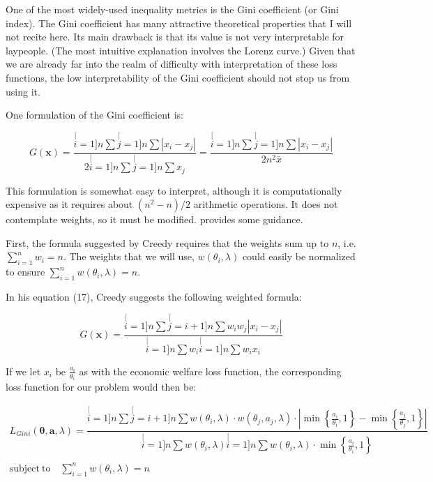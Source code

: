 \documentclass[english]{article}
\begin{document}
One of the most widely-used inequality metrics is the Gini coefficient
(or Gini index). The Gini coefficient has many attractive theoretical
properties that I will not recite here. Its main drawback is that
its value is not very interpretable for laypeople. (The most intuitive
explanation involves the Lorenz curve.) Given that we are already
far into the realm of difficulty with interpretation of these loss
functions, the low interpretability of the Gini coefficient should
not stop us from using it.

One formulation of the Gini coefficient is:

\[
G(\mathbf{x})=\dfrac{\stackrel[i=1]{n}{\sum}\stackrel[j=1]{n}{\sum}\left|x_{i}-x_{j}\right|}{2\stackrel[i=1]{n}{\sum}\stackrel[j=1]{n}{\sum}x_{j}}=\dfrac{\stackrel[i=1]{n}{\sum}\stackrel[j=1]{n}{\sum}\left|x_{i}-x_{j}\right|}{2n^{2}\bar{x}}
\]

This formulation is somewhat easy to interpret, although it is computationally
expensive as it requires about $\left(n^{2}-n\right)/2$ arithmetic
operations. It does not contemplate weights, so it must be modified.
\cite{Creedy2015} provides some guidance.

First, the formula suggested by Creedy requires that the weights sum
up to $n$, i.e. $\sum_{i=1}^{n}w_{i}=n$. The weights that we will
use, $w(\theta_{i},\lambda)$ could easily be normalized to ensure
$\sum_{i=1}^{n}w(\theta_{i},\lambda)=n$.

In his equation (17), Creedy suggests the following weighted formula:

\[
G(\mathbf{x})=\dfrac{\stackrel[i=1]{n}{\sum}\stackrel[j=i+1]{n}{\sum}w_{i}w_{j}\left|x_{i}-x_{j}\right|}{\stackrel[i=1]{n}{\sum}w_{i}\stackrel[i=1]{n}{\sum}w_{i}x_{i}}
\]

If we let $x_{i}$ be $\tfrac{a_{i}}{\theta_{i}}$ as with the economic
welfare loss function, the corresponding loss function for our problem
would then be:

\begin{equation}
\begin{array}{c}
L_{Gini}(\boldsymbol{\theta},\boldsymbol{a},\lambda)=\dfrac{\stackrel[i=1]{n}{\sum}\stackrel[j=i+1]{n}{\sum}w(\theta_{i},\lambda)\cdot w(\theta_{j},a_{j},\lambda)\cdot\left|\min\left\{ \tfrac{a_{i}}{\theta_{i}},1\right\} -\min\left\{ \tfrac{a_{j}}{\theta_{j}},1\right\} \right|}{\stackrel[i=1]{n}{\sum}w(\theta_{i},\lambda)\stackrel[i=1]{n}{\sum}w(\theta_{i},\lambda)\cdot\min\left\{ \tfrac{a_{i}}{\theta_{i}},1\right\} }\\
\\
\mathrm{subject\:to}\quad\sum_{i=1}^{n}w(\theta_{i},\lambda)=n
\end{array}\label{eq:L-Gini}
\end{equation}
\end{document}
